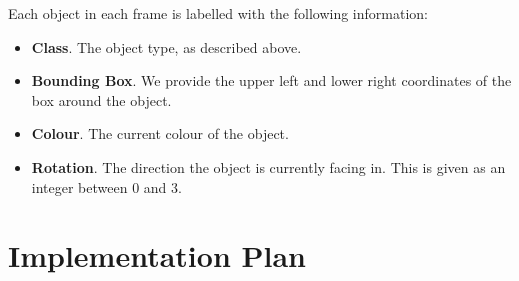\documentclass[../interim.tex]{subfiles}
\begin{document}
Each object in each frame is labelled with the following information:
\begin{itemize}
  \item \textbf{Class}. The object type, as described above.

  \item \textbf{Bounding Box}. We provide the upper left and lower right coordinates of the box around the object.

  \item \textbf{Colour}. The current colour of the object.

  \item \textbf{Rotation}. The direction the object is currently facing in. This is given as an integer between 0 and 3.
\end{itemize}

\section{Implementation Plan}
\end{document}
